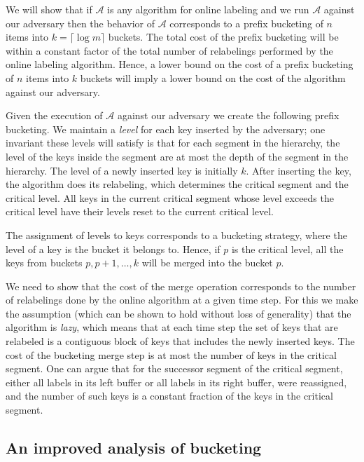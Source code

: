 \documentclass[runningheads,a4paper]{llncs}
\newcommand{\A}{\mathcal{A}}
\begin{document}
We will show that if $\A$ is any algorithm for online labeling and we run $\A$ against our adversary then
the behavior of $\A$ corresponds to a prefix bucketing of $n$ items into $k=\lceil \log m \rceil$ buckets.
The total cost of the prefix bucketing will be within a constant factor of  the total number of relabelings
performed by the online labeling algorithm. Hence, a lower bound on the cost of a prefix bucketing of $n$ items into $k$ 
buckets will imply a lower bound on the cost of the algorithm against our adversary. 

Given the execution of $\A$ against our adversary we create 
the following prefix bucketing.  We maintain a \emph{level} for each key inserted by the adversary; one invariant
these levels will satisfy is that for each segment in the hierarchy, the level of the keys inside
the segment are at most the depth of the segment in the hierarchy.
The level of a newly inserted key is initially $k$. After inserting the key, the algorithm
does its relabeling, which determines the critical segment and the critical level.
All keys in the current critical segment whose level exceeds the critical level have their levels
reset to the current critical level.   

The assignment of levels to keys corresponds to a bucketing strategy, where the level of a key is the bucket
it belongs to.   Hence, if $p$ is the critical level, all the keys from 
buckets $p,p+1,\dots,k$ will be merged into the bucket $p$. 

We need to show that 
the cost of the merge operation corresponds to the number of relabelings done by the online algorithm
at a given time step.  For this we  make the assumption (which can be shown to hold without loss of generality) that the algorithm is \emph{lazy}, which means
that at each time step the set of keys that are relabeled is a contiguous block of keys that includes
the newly inserted keys.    The cost of the bucketing merge step is at most the number of keys in
the critical segment.  One can argue that for the successor segment of the critical segment, either all labels in its left buffer
or all labels in its right buffer, were reassigned, and the number of such keys is a constant fraction of the keys
in the critical segment. 


\subsection{An improved analysis of bucketing}
\end{document}
